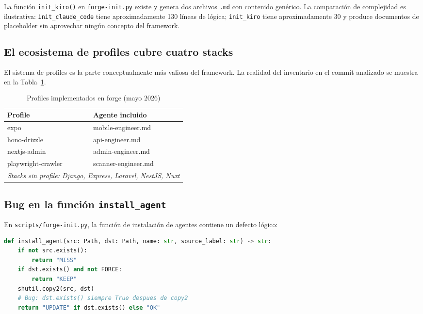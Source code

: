 \documentclass[12pt,a4paper]{article}
\begin{document}
La función \texttt{init\_kiro()} en \texttt{forge-init.py} existe y genera dos archivos
\texttt{.md} con contenido genérico. La comparación de complejidad es ilustrativa:
\texttt{init\_claude\_code} tiene aproximadamente 130 líneas de lógica; \texttt{init\_kiro}
tiene aproximadamente 30 y produce documentos de placeholder sin aprovechar ningún
concepto del framework.

\subsection{El ecosistema de profiles cubre cuatro stacks}

El sistema de profiles es la parte conceptualmente más valiosa del framework.
La realidad del inventario en el commit analizado se muestra en la Tabla~\ref{tab:profiles}.

\begin{table}[h]
\centering
\caption{Profiles implementados en forge (mayo 2026)}
\label{tab:profiles}
\begin{tabular}{@{}ll@{}}
\toprule
\textbf{Profile} & \textbf{Agente incluido} \\
\midrule
expo & mobile-engineer.md \\
hono-drizzle & api-engineer.md \\
nextjs-admin & admin-engineer.md \\
playwright-crawler & scanner-engineer.md \\
\midrule
\multicolumn{2}{l}{\textit{Stacks sin profile: Django, Express, Laravel, NestJS, Nuxt}} \\
\bottomrule
\end{tabular}
\end{table}

\subsection{Bug en la función \texttt{install\_agent}}

En \texttt{scripts/forge-init.py}, la función de instalación de agentes contiene
un defecto lógico:

\begin{lstlisting}[language=Python, caption={Bug en install\_agent: status "OK" nunca retorna}]
def install_agent(src: Path, dst: Path, name: str, source_label: str) -> str:
    if not src.exists():
        return "MISS"
    if dst.exists() and not FORCE:
        return "KEEP"
    shutil.copy2(src, dst)
    # Bug: dst.exists() siempre True despues de copy2
    return "UPDATE" if dst.exists() else "OK"
\end{lstlisting}
\end{document}

